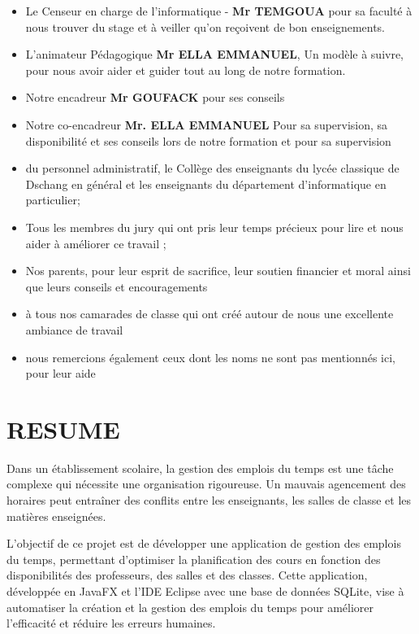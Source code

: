 \documentclass[english,12pt,a4paper]{report}
\begin{document}
\begin{spacing}{1.5}
\begin{itemize}[label=\textbullet, font=\LARGE %
	]
	\item Le Censeur en charge de l'informatique - \textbf{Mr TEMGOUA} pour sa faculté à nous trouver du stage et à veiller qu'on reçoivent de bon enseignements.
	
	\item L'animateur Pédagogique \textbf{Mr ELLA EMMANUEL}, Un modèle à suivre, pour nous avoir aider et guider tout au long de notre formation.
	
	\item Notre encadreur  \textbf{	Mr GOUFACK }  pour ses conseils   
	
	\item Notre co-encadreur \textbf{Mr. ELLA EMMANUEL } Pour sa supervision, sa disponibilité et ses conseils lors de notre formation  et pour sa supervision 
	
	
	\item du personnel administratif, le Collège des enseignants du lycée classique de Dschang en général et les enseignants du département d'informatique en particulier;
	
	\item Tous les membres du jury qui ont pris leur temps précieux pour lire et nous aider à améliorer ce travail ; 
	
	\item 	 Nos parents, pour leur esprit de sacrifice, leur soutien financier et moral ainsi que leurs conseils et encouragements
	\item 	 à tous nos camarades de classe qui ont créé autour de nous une excellente ambiance de travail
	\item 	 nous remercions également ceux dont les noms ne sont pas mentionnés ici, pour leur aide
\end{itemize}	

\chapter*{RESUME}
\hspace{1.2cm}
Dans un établissement scolaire, la gestion des emplois du temps est une tâche complexe qui nécessite une organisation rigoureuse. Un mauvais agencement des horaires peut entraîner des conflits entre les enseignants, les salles de classe et les matières enseignées.

L’objectif de ce projet est de développer une application de gestion des emplois du temps, permettant d’optimiser la planification des cours en fonction des disponibilités des professeurs, des salles et des classes. Cette application, développée en JavaFX et l'IDE Eclipse avec une base de données SQLite, vise à automatiser la création et la gestion des emplois du temps pour améliorer l’efficacité et réduire les erreurs humaines.


\end{spacing}
\end{document}
